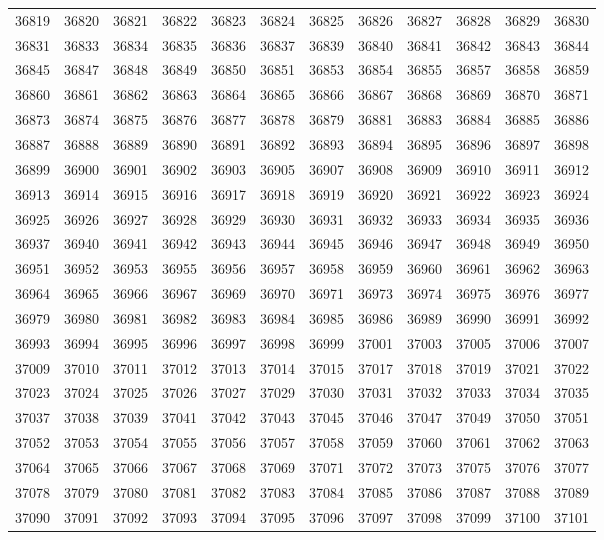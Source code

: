 \begin{center}
\begin{longtable}{llllllllllll}
36819 &36820 &36821 &36822 &36823 &36824 &36825 &36826 &36827 &36828 &36829 &36830 \\
36831 &36833 &36834 &36835 &36836 &36837 &36839 &36840 &36841 &36842 &36843 &36844 \\
36845 &36847 &36848 &36849 &36850 &36851 &36853 &36854 &36855 &36857 &36858 &36859 \\
36860 &36861 &36862 &36863 &36864 &36865 &36866 &36867 &36868 &36869 &36870 &36871 \\
36873 &36874 &36875 &36876 &36877 &36878 &36879 &36881 &36883 &36884 &36885 &36886 \\
36887 &36888 &36889 &36890 &36891 &36892 &36893 &36894 &36895 &36896 &36897 &36898 \\
36899 &36900 &36901 &36902 &36903 &36905 &36907 &36908 &36909 &36910 &36911 &36912 \\
36913 &36914 &36915 &36916 &36917 &36918 &36919 &36920 &36921 &36922 &36923 &36924 \\
36925 &36926 &36927 &36928 &36929 &36930 &36931 &36932 &36933 &36934 &36935 &36936 \\
36937 &36940 &36941 &36942 &36943 &36944 &36945 &36946 &36947 &36948 &36949 &36950 \\
36951 &36952 &36953 &36955 &36956 &36957 &36958 &36959 &36960 &36961 &36962 &36963 \\
36964 &36965 &36966 &36967 &36969 &36970 &36971 &36973 &36974 &36975 &36976 &36977 \\
36979 &36980 &36981 &36982 &36983 &36984 &36985 &36986 &36989 &36990 &36991 &36992 \\
36993 &36994 &36995 &36996 &36997 &36998 &36999 &37001 &37003 &37005 &37006 &37007 \\
37009 &37010 &37011 &37012 &37013 &37014 &37015 &37017 &37018 &37019 &37021 &37022 \\
37023 &37024 &37025 &37026 &37027 &37029 &37030 &37031 &37032 &37033 &37034 &37035 \\
37037 &37038 &37039 &37041 &37042 &37043 &37045 &37046 &37047 &37049 &37050 &37051 \\
37052 &37053 &37054 &37055 &37056 &37057 &37058 &37059 &37060 &37061 &37062 &37063 \\
37064 &37065 &37066 &37067 &37068 &37069 &37071 &37072 &37073 &37075 &37076 &37077 \\
37078 &37079 &37080 &37081 &37082 &37083 &37084 &37085 &37086 &37087 &37088 &37089 \\
37090 &37091 &37092 &37093 &37094 &37095 &37096 &37097 &37098 &37099 &37100 &37101 \\

\end{longtable}
\end{center}
